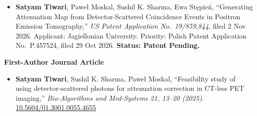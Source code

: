 \noindent {}
\begin{itemize}
\item \textbf{Satyam Tiwari}, Pawe{\l} Moskal, Sushil K. Sharma, Ewa St{\k{e}}pie{\'n}, ``Generating Attenuation Map from Detector-Scattered Coincidence Events in Positron Emission Tomography,'' \emph{US Patent Application No.\ 19/859,844}, filed 2 Nov 2026. Applicant: Jagiellonian University. Priority: Polish Patent Application No.\ P.457524, filed 29 Oct 2026. \textbf{Status: Patent Pending.}
\end{itemize}

\noindent {}

\textcolor{accentblue}{\textbf{First-Author Journal Article}}
\begin{itemize}
\item \textbf{Satyam Tiwari}, Sushil K. Sharma, Pawe{\l} Moskal, ``Feasibility study of using detector-scattered photons for attenuation correction in CT-less PET imaging,'' \emph{Bio-Algorithms and Med-Systems 21, 13--20 (2025)}.\\
\href{https://doi.org/10.5604/01.3001.0055.4655}{10.5604/01.3001.0055.4655}
\end{itemize}

